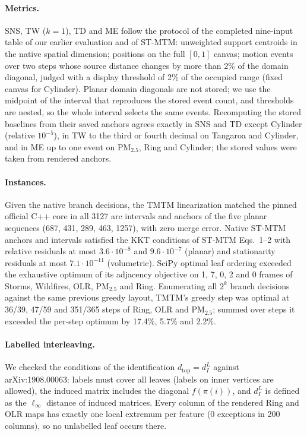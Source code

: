 \documentclass[10pt]{article}
\newcommand{\dtop}{d_{\mathrm{top}}}
\begin{document}
\paragraph{Metrics.} SNS, TW ($k=1$), TD and ME follow the protocol of the completed nine-input table of our earlier evaluation and of ST-MTM: unweighted support centroids in the native spatial dimension; positions on the full $[0,1]$ canvas; motion events over two steps whose source distance changes by more than 2\% of the domain diagonal, judged with a display threshold of 2\% of the occupied range (fixed canvas for Cylinder). Planar domain diagonals are not stored; we use the midpoint of the interval that reproduces the stored event count, and thresholds are nested, so the whole interval selects the same events. Recomputing the stored baselines from their saved anchors agrees exactly in SNS and TD except Cylinder (relative $10^{-5}$), in TW to the third or fourth decimal on Tangaroa and Cylinder, and in ME up to one event on PM$_{2.5}$, Ring and Cylinder; the stored values were taken from rendered anchors.

\paragraph{Instances.} Given the native branch decisions, the TMTM linearization matched the pinned official C++ core in all 3127 arc intervals and anchors of the five planar sequences (687, 431, 289, 463, 1257), with zero merge error. Native ST-MTM anchors and intervals satisfied the KKT conditions of ST-MTM Eqs.~1--2 with relative residuals at most $3.6\cdot10^{-8}$ and $9.6\cdot10^{-7}$ (planar) and stationarity residuals at most $7.1\cdot10^{-11}$ (volumetric). SciPy optimal leaf ordering exceeded the exhaustive optimum of its adjacency objective on 1, 7, 0, 2 and 0 frames of Storms, Wildfires, OLR, PM$_{2.5}$ and Ring. Enumerating all $2^k$ branch decisions against the same previous greedy layout, TMTM's greedy step was optimal at 36/39, 47/59 and 351/365 steps of Ring, OLR and PM$_{2.5}$; summed over steps it exceeded the per-step optimum by 17.4\%, 5.7\% and 2.2\%.

\paragraph{Labelled interleaving.} We checked the conditions of the identification $\dtop=d_I^L$ against arXiv:1908.00063: labels must cover all leaves (labels on inner vertices are allowed), the induced matrix includes the diagonal $f(\pi(i))$, and $d_I^L$ is defined as the $\ell_\infty$ distance of induced matrices. Every column of the rendered Ring and OLR maps has exactly one local extremum per feature (0 exceptions in 200 columns), so no unlabelled leaf occurs there.
\end{document}

